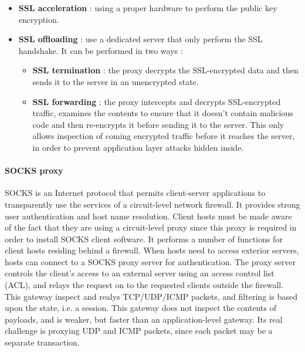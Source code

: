 \documentclass[11pt]{article}
\begin{document}
\begin{itemize}
\item \textbf{SSL acceleration} : using a proper hardware to perform the public key encryption.
\item \textbf{SSL offloading} : use a dedicated server that only perform the SSL handshake. It can be performed in two ways : 
\begin{itemize}
\item \textbf{SSL termination} : the proxy decrypts the SSL-encrypted data and then sends it to the server in an unencrypted state.
\item \textbf{SSL forwarding} : the proxy intercepts and decrypts SSL-encrypted traffic, examines the contents to ensure that it doesn't contain malicious code and then re-encrypts it before sending it to the server. This only allows inspection of coming encrypted traffic before it reaches the server, in order to prevent application layer attacks hidden inside.
\end{itemize}
\end{itemize}
\paragraph{SOCKS proxy} SOCKS is an Internet protocol that permits client-server applications to transparently use the services of a circuit-level network firewall. It provides strong user authentication and host name resolution. Client hosts must be made aware of the fact that they are using a circuit-level proxy since this proxy is required in order to install SOCKS client software. It performs a number of functions for client hosts residing behind a firewall. When hosts need to access exterior servers, hosts can connect to a SOCKS proxy server for authentication. The proxy server controls the client's access to an external server using an access control list (ACL), and relays the request on to the requested clients outside the firewall. This gateway inspect and realys TCP/UDP/ICMP packets, and filtering is based upon the state, i.e. a session. This gateway does not inspect the contents of payloads, and is weaker, but faster than an application-level gateway. Its real challenge is proxying UDP and ICMP packets, since each packet may be a separate transaction.
\end{document}
